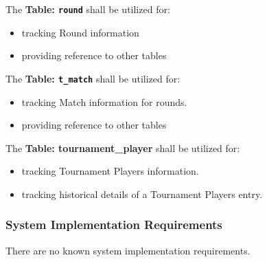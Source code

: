 \documentclass[11pt]{article}
\begin{document}
            The \textbf{Table: \texttt{round}} shall be utilized for:
            \begin{itemize}
                \item tracking Round information
                \item providing reference to other tables
            \end{itemize}


            The \textbf{Table: \texttt{t\_match}} shall be utilized for:
            \begin{itemize}
                \item tracking Match information for rounds.
                \item providing reference to other tables
            \end{itemize}

            The \textbf{Table: tournament\_player} shall be utilized for:
            \begin{itemize}
                \item tracking Tournament Players information.
                \item tracking historical details of a Tournament Players entry.
            \end{itemize}

        \subsubsection{System Implementation Requirements}
            There are no known system implementation requirements.

        \newpage
\end{document}
